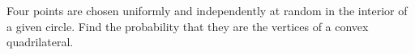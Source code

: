 Four points are chosen uniformly and independently at random in the interior
of a given circle. Find the probability that they are the vertices
of a convex quadrilateral.
